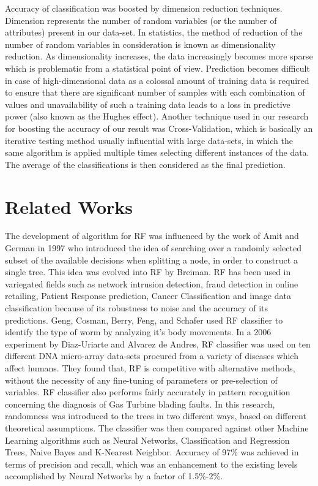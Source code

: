 \documentclass{llncs}
\begin{document}
Accuracy of classification was boosted by dimension reduction techniques. Dimension represents the number of random variables (or the number of attributes) present in our data-set. In statistics, the method of reduction of the number of random variables in consideration is known as dimensionality reduction. As dimensionality increases, the data increasingly becomes more sparse which is problematic from a statistical point of view. Prediction becomes difficult in case of high-dimensional data as a colossal amount of training data is required to ensure that there are significant number of samples with each combination of values and unavailability of such a training data leads to a loss in predictive power (also known as the Hughes effect\cite{hughes}). Another technique used in our research for boosting the accuracy of our result was Cross-Validation, which is basically an iterative testing method usually influential with large data-sets, in which the same algorithm is applied multiple times selecting different instances of the data. The average of the classifications is then considered as the final prediction.

\section{Related Works}

The development of algorithm for RF was influenced by the work of Amit and German\cite{AmitGer} in 1997 who introduced the idea of searching over a randomly selected subset of the available decisions when splitting a node, in order to construct a single tree. This idea was evolved into RF by Breiman\cite{Breiman}. RF has been used in variegated fields such as network intrusion detection\cite{ZhangZulker}, fraud detection in online retailing\cite{AltenBren}, Patient Response prediction\cite{DittKhosh}, Cancer Classification\cite{Srivastava} and image data classification\cite{Boinee} because of its robustness to noise and the accuracy of its predictions. Geng, Cosman, Berry, Feng, and Schafer\cite{Geng} used RF classifier to identify the type of worm by analyzing it's body movements. In a 2006 experiment by Diaz-Uriarte and Alvarez de Andres, RF classifier was used on ten different DNA micro-array data-sets procured from a variety of diseases which affect humans\cite{DiazAlvarez}. They found that, RF is competitive with alternative methods, without the necessity of any fine-tuning of parameters or pre-selection of variables. RF classifier also performs fairly accurately in pattern recognition concerning the diagnosis of Gas Turbine blading faults\cite{Margou}. In this research, randomness was introduced to the trees in two different ways, based on different theoretical assumptions. The classifier was then compared against other Machine Learning algorithms such as Neural Networks, Classification and Regression Trees, Naive Bayes and K-Nearest Neighbor. Accuracy of 97\% was achieved in terms of precision and recall, which was an enhancement to the existing levels accomplished by Neural Networks by a factor of 1.5\%-2\%.
\end{document}
